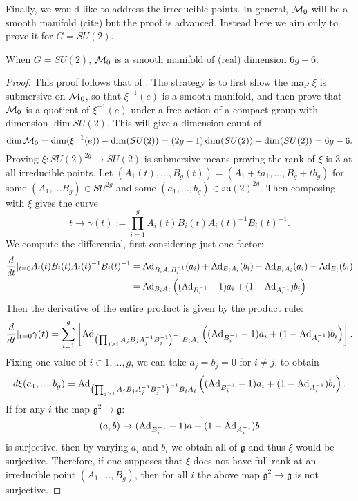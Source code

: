 	Finally, we would like to address the irreducible points. In general, $\mathcal{M}_0$ will be a smooth manifold (cite) but the proof is advanced. Instead here we aim only to prove it for $G=SU(2)$. 
	\begin{theorem}
		When $G=SU(2)$, $\mathcal{M}_0$ is a smooth manifold of (real) dimension $6g-6$.
	\end{theorem}
	\begin{proof}
		This proof follows that of \cite[Thm 96]{michiels_moduli_nodate}. The strategy is to first show the map $\xi$ is submersive on $\mathcal{M}_0$, so that $\xi^{-1}(e)$ is a smooth manifold, and then prove that $\mathcal{M}_0$ is a quotient of $\xi^{-1}(e)$ under a free action of a compact group with dimension $\dim SU(2)$. This will give a dimension count of
		\begin{equation}
			\dim \mathcal{M}_0 = \dim(\xi^{-1}(e)) - \dim(SU(2)) = (2g-1)\dim(SU(2)) - \dim(SU(2)) = 6g-6.
		\end{equation} 
		Proving $\xi:SU(2)^{2g} \to SU(2)$ is submersive means proving the rank of $\xi$ is 3 at all irreducible points. Let $(A_1(t),...,B_g(t)) = (A_1 + ta_1,..., B_g + tb_g)$ for some $(A_1,...B_g) \in SU^{2g}$ and some $(a_1,...,b_g) \in \mathfrak{su}(2)^{2g}$. Then composing with $\xi$ gives the curve
		\begin{equation}
			t\to \gamma(t):= \prod_{i=1}^g A_i(t)B_i(t)A_i(t)^{-1}B_i(t)^{-1}.
		\end{equation}
		We compute the differential, first considering just one factor:
		\begin{align*}
			\frac{d}{dt}|_{t=0} A_i(t)B_i(t)A_i(t)^{-1}B_i(t)^{-1} &= \text{Ad}_{B_iA_iB_i^{-1}}(a_i) + \text{Ad}_{B_iA_i}(b_i) - \text{Ad}_{B_iA_i}(a_i) - \text{Ad}_{B_i}(b_i)\\
			&= \text{Ad}_{B_iA_i}\left(
			(\text{Ad}_{B_i^{-1}}-1)a_i + (1-\text{Ad}_{A_i^{-1}})b_i
			\right)
		\end{align*}
		Then the derivative of the entire product is given by the product rule:
		\begin{equation}
			\frac{d}{dt}|_{t=0} \gamma(t) = \sum_{i=1}^g \left[
			\text{Ad}_{\left(\prod_{j>i} A_jB_jA_j^{-1}B_j^{-1}\right)^{-1}B_iA_i} \left((\text{Ad}_{B_i^{-1}}-1)a_i + (1-\text{Ad}_{A_i^{-1}})b_i\right)
			\right].
		\end{equation}
		Fixing one value of $i\in {1,...,g}$, we can take $a_j = b_j =0$ for $i\neq j$, to obtain
		\begin{equation}
			d\xi(a_1,...,b_g) = \text{Ad}_{\left(\prod_{j>i} A_jB_jA_j^{-1}B_j^{-1}\right)^{-1}B_iA_i} \left((\text{Ad}_{B_i^{-1}}-1)a_i + (1-\text{Ad}_{A_i^{-1}})b_i\right).
		\end{equation}
		If for any $i$ the map $\mathfrak{g}^2\to\mathfrak{g}$:
		\begin{equation}
			(a,b) \to (\text{Ad}_{B_i^{-1}} - 1)a + (1-\text{Ad}_{A_i^{-1}})b
		\end{equation}
		is surjective, then by varying $a_i$ and $b_i$ we obtain all of $\mathfrak{g}$ and thus $\xi$ would be  surjective. Therefore, if one supposes that $\xi$ does not have full rank at an irreducible point $(A_1,...,B_g)$, then for all $i$ the above map $\mathfrak{g}^2\to\mathfrak{g}$ is not surjective.
		

\end{proof}
